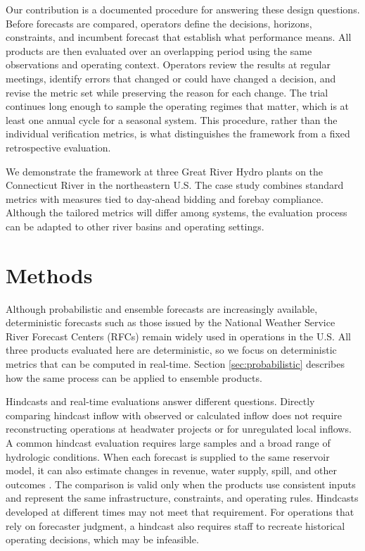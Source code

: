 \documentclass[MLA]{USG} %
\begin{document}
Our contribution is a documented procedure for answering these design questions. Before forecasts are compared, operators define the decisions, horizons, constraints, and incumbent forecast that establish what performance means. All products are then evaluated over an overlapping period using the same observations and operating context. Operators review the results at regular meetings, identify errors that changed or could have changed a decision, and revise the metric set while preserving the reason for each change. The trial continues long enough to sample the operating regimes that matter, which is at least one annual cycle for a seasonal system. This procedure, rather than the individual verification metrics, is what distinguishes the framework from a fixed retrospective evaluation.

We demonstrate the framework at three Great River Hydro plants on the Connecticut River in the northeastern U.S. The case study combines standard metrics with measures tied to day-ahead bidding and forebay compliance. Although the tailored metrics will differ among systems, the evaluation process can be adapted to other river basins and operating settings.


\section{Methods}

Although probabilistic and ensemble forecasts are increasingly available, deterministic forecasts such as those issued by the National Weather Service River Forecast Centers (RFCs) remain widely used in operations in the U.S. All three products evaluated here are deterministic, so we focus on deterministic metrics that can be computed in real-time. Section \ref{sec:probabilistic} describes how the same process can be applied to ensemble products.

Hindcasts and real-time evaluations answer different questions. Directly comparing hindcast inflow with observed or calculated inflow does not require reconstructing operations at headwater projects or for unregulated local inflows. A common hindcast evaluation requires large samples and a broad range of hydrologic conditions. When each forecast is supplied to the same reservoir model, it can also estimate changes in revenue, water supply, spill, and other outcomes \citep{farkasEconomicValueWeather2025}. The comparison is valid only when the products use consistent inputs and represent the same infrastructure, constraints, and operating rules. Hindcasts developed at different times may not meet that requirement. For operations that rely on forecaster judgment, a hindcast also requires staff to recreate historical operating decisions, which may be infeasible.
\end{document}
